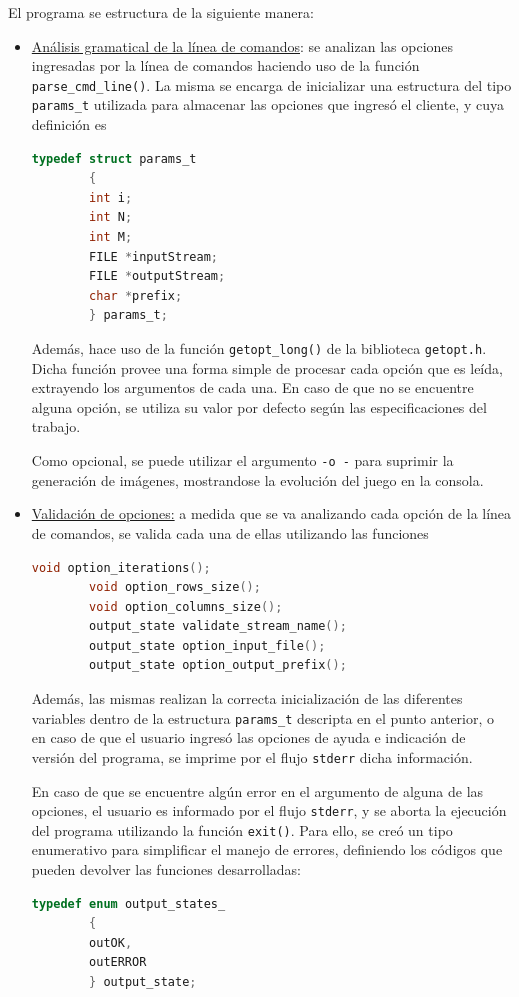 \documentclass[a4paper,12pt]{article}
\numberwithin{equation}{section}
\numberwithin{figure}{section}
\begin{document}
El programa se estructura de la siguiente manera:
\begin{itemize}
	\item \underline{Análisis gramatical de la línea de comandos}: se analizan las opciones ingresadas por la línea de comandos haciendo uso de la función \texttt{parse\_cmd\_line()}. La misma se encarga de inicializar una estructura del tipo \texttt{params\_t} utilizada para almacenar las opciones que ingresó el cliente, y cuya definición es
	\begin{lstlisting}[language=C, style=StyleC]
    	typedef struct params_t
    	{
    	int i;
    	int N;
    	int M;
    	FILE *inputStream;
    	FILE *outputStream;
    	char *prefix;
    	} params_t;
	\end{lstlisting}
	Además, hace uso de la función \texttt{getopt\_long()} de la biblioteca \texttt{getopt.h}. Dicha función provee una forma simple de procesar cada opción que es leída, extrayendo los argumentos de cada una. En caso de que no se encuentre alguna opción, se utiliza su valor por defecto según las especificaciones del trabajo.
	
	Como opcional, se puede utilizar el argumento \texttt{-o -} para suprimir la generación de imágenes, mostrandose la evolución del juego en la consola.

	\item \underline{Validación de opciones:} a medida que se va analizando cada opción de la línea de comandos, se valida cada una de ellas utilizando las funciones 
	\begin{lstlisting}[language=C, style=StyleC]
    	void option_iterations();
    	void option_rows_size();
    	void option_columns_size();
    	output_state validate_stream_name();
    	output_state option_input_file();
    	output_state option_output_prefix();
    \end{lstlisting}
    Además, las mismas realizan la correcta inicialización de las diferentes variables dentro de la estructura \texttt{params\_t} descripta en el punto anterior, o en caso de que el usuario ingresó las opciones de ayuda e indicación de versión del programa, se imprime por el flujo \texttt{stderr} dicha información.
    
	En caso de que se encuentre algún error en el argumento de alguna de las opciones, el usuario es informado por el flujo \texttt{stderr}, y se aborta la ejecución del programa utilizando la función \texttt{exit()}. Para ello, se creó un tipo enumerativo para simplificar el manejo de errores, definiendo los códigos que pueden devolver las funciones desarrolladas:
	\begin{lstlisting}[language=C, style=StyleC]
		typedef enum output_states_
		{
		outOK,
		outERROR
		} output_state;
	\end{lstlisting}
	

\end{itemize}
\end{document}
